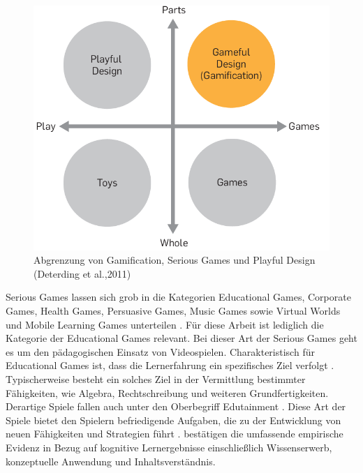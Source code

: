 \begin{figure}[htp]
    \centering
    \includegraphics{img/detering_gamificatrion_pic.png}
    \caption{Abgrenzung von Gamification, Serious Games und Playful Design (Deterding  et  al.,2011)}
    \label{fig:deterding}
\end{figure}

Serious Games lassen sich grob in die Kategorien Educational  Games, 
Corporate  Games,  Health  Games,  Persuasive  Games,  Music  Games  sowie  Virtual  Worlds  und 
Mobile Learning Games unterteilen \cite[S.4]{bopp_serious_2009}.
Für diese Arbeit ist lediglich die Kategorie der Educational  Games relevant.
Bei dieser Art der Serious Games geht es um den pädagogischen Einsatz von Videospielen.
Charakteristisch für Educational  Games ist, dass die Lernerfahrung ein spezifisches Ziel verfolgt \cite{nielsen_overview_2006, bopp_serious_2009}.
Typischerweise besteht ein solches Ziel in der Vermittlung bestimmter Fähigkeiten, wie Algebra, Rechtschreibung und weiteren Grundfertigkeiten.
Derartige Spiele fallen auch unter den Oberbegriff Edutainment \cite{nielsen_overview_2006}.
Diese Art der Spiele bietet den Spielern befriedigende Aufgaben, die zu der Entwicklung von neuen Fähigkeiten und Strategien führt \cite{stapleton_serious_2004}.
 bestätigen die umfassende empirische Evidenz in Bezug auf kognitive Lernergebnisse einschließlich Wissenserwerb, konzeptuelle Anwendung und Inhaltsverständnis.


